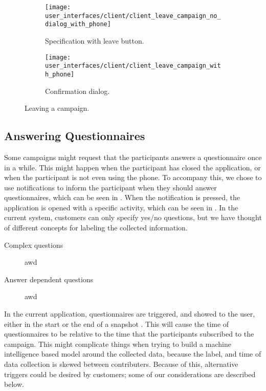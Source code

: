 \begin{figure}[!htbp]
\begin{subfigure}[!t]{.50\textwidth}
  \centering
  \texttt{[image: user\_interfaces/client/client\_leave\_campaign\_no\_dialog\_with\_phone]}
  \caption{Specification with leave button.}
  \label{fig:leave_campaign_no_dialog}
\end{subfigure}%
\begin{subfigure}[!t]{.50\textwidth}
  \centering
  \texttt{[image: user\_interfaces/client/client\_leave\_campaign\_with\_phone]}
  \caption{Confirmation dialog.}
  \label{fig:leave_campaign_dialog}
\end{subfigure}
\caption{Leaving a campaign.}
\label{fig:leave_campaign}
\end{figure}
\FloatBarrier

\subsection{Answering Questionnaires}

Some campaigns might request that the participants answers a questionnaire once in a while. This might happen when the participant has closed the application, or when the participant is not even using the phone. To accompany this, we chose to use notifications to inform the participant when they should answer questionnaires, which can be seen in . When the notification is pressed, the application is opened with a specific activity, which can be seen in . In the current system, customers can only specify yes/no questions, but we have thought of different concepts for labeling the collected information.

\begin{description}
  	\item[Complex questions] awd

  	\item[Answer dependent questions] awd
\end{description}

In the current application, questionnaires are triggered, and showed to the user, either in the start or the end of a snapshot . This will cause the time of questionnaires to be relative to the time that the participants subscribed to the campaign. This might complicate things when trying to build a machine intelligence based model around the collected data, because the label, and time of data collection is skewed between contributers. Because of this, alternative triggers could be desired by customers; some of our considerations are described below.

